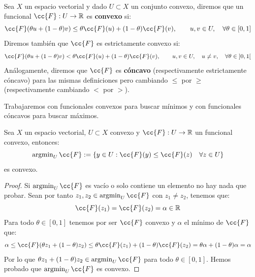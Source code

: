 \begin{definicion}
    Sea $X$ un espacio vectorial y dado $U\subset X$ un conjunto convexo, diremos que un funcional $\cc{F}:U\to \mathbb{R}$ es \textbf{convexo} si:
    \begin{equation*}
        \cc{F}(\theta u + (1-\theta)v) \leq \theta \cc{F}(u) + (1-\theta) \cc{F}(v), \qquad u,v\in U, \quad \forall \theta \in [0,1]
    \end{equation*}
    Diremos también que $\cc{F}$ es estrictamente convexo si:
    \begin{equation*}
        \cc{F}(\theta u + (1-\theta)v) < \theta \cc{F}(u) + (1-\theta) \cc{F}(v), \qquad u,v\in U,\quad  u\neq v, \quad \forall \theta \in \left]0,1\right[
    \end{equation*}
    Análogamente, diremos que $\cc{F}$ es \textbf{cóncavo} (respectivamente estrictamente cóncavo) para las mismas definiciones pero cambiando $\leq$ por $\geq$ (respectivamente cambiando $<$ por $>$).
\end{definicion}

\noindent
Trabajaremos con funcionales convexos para buscar mínimos y con funcionales cóncavos para buscar máximos.

\begin{lema}
    Sea $X$ un espacio vectorial, $U\subset X$ convexo y $\cc{F}:U\to \mathbb{R}$ un funcional convexo, entonces:
    \begin{equation*}
        \argmin_U \cc{F} := \{y\in U : \cc{F}(y) \leq \cc{F}(z) \quad \forall z\in U\}
    \end{equation*}
    es convexo.
    \begin{proof}
        Si $\argmin_U \cc{F}$ es vacío o solo contiene un elemento no hay nada que probar. Sean por tanto $z_1,z_2\in \argmin_U\cc{F}$ con $z_1\neq z_2$, tenemos que:
        \begin{equation*}
            \cc{F}(z_1) = \cc{F}(z_2) = \alpha\in \mathbb{R}
        \end{equation*}
        Para todo $\theta \in [0,1]$ tenemos por ser $\cc{F}$ convexo y $\alpha$ el mínimo de $\cc{F}$ que:
        \begin{equation*}
            \alpha \leq \cc{F}(\theta z_1 + (1-\theta)z_2) \leq \theta \cc{F}(z_1) + (1-\theta)\cc{F}(z_2) = \theta \alpha + (1-\theta) \alpha = \alpha
        \end{equation*}
        Por lo que $\theta z_1 + (1-\theta)z_2\in \argmin_U\cc{F}$ para todo $\theta \in [0,1]$. Hemos probado que $\argmin_U\cc{F}$ es convexo.
    \end{proof}
\end{lema}

